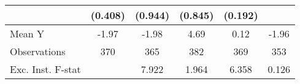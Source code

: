 {\begin{tabular}{l*{5}{c}}
            &     (0.408)         &     (0.944)         &     (0.845)         &     (0.192)         &                     \\
\midrule
Mean Y      &       -1.97         &       -1.98         &        4.69         &        0.12         &       -1.96         \\
Observations&         370         &         365         &         382         &         369         &         353         \\
Exc. Inst. F-stat&                     &       7.922         &       1.964         &       6.358         &       0.126         \\
\bottomrule
\end{tabular}
}
